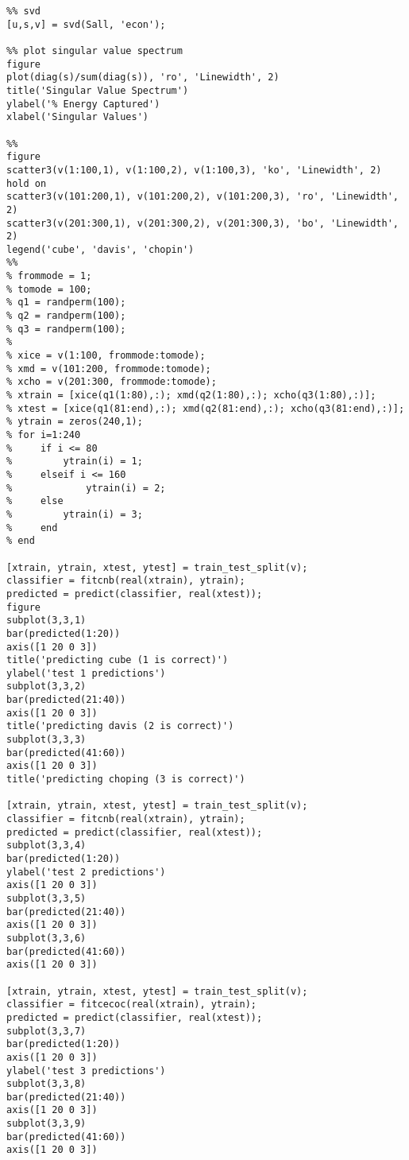 \documentclass[12pt, a4paper]{article}
\begin{document}
\begin{verbatim}
%% svd
[u,s,v] = svd(Sall, 'econ');

%% plot singular value spectrum
figure
plot(diag(s)/sum(diag(s)), 'ro', 'Linewidth', 2)
title('Singular Value Spectrum')
ylabel('% Energy Captured')
xlabel('Singular Values')

%%
figure
scatter3(v(1:100,1), v(1:100,2), v(1:100,3), 'ko', 'Linewidth', 2)
hold on 
scatter3(v(101:200,1), v(101:200,2), v(101:200,3), 'ro', 'Linewidth', 2)
scatter3(v(201:300,1), v(201:300,2), v(201:300,3), 'bo', 'Linewidth', 2)
legend('cube', 'davis', 'chopin')
%%
% frommode = 1;
% tomode = 100;
% q1 = randperm(100);
% q2 = randperm(100);
% q3 = randperm(100);
% 
% xice = v(1:100, frommode:tomode);
% xmd = v(101:200, frommode:tomode);
% xcho = v(201:300, frommode:tomode);
% xtrain = [xice(q1(1:80),:); xmd(q2(1:80),:); xcho(q3(1:80),:)];
% xtest = [xice(q1(81:end),:); xmd(q2(81:end),:); xcho(q3(81:end),:)];
% ytrain = zeros(240,1);
% for i=1:240
%     if i <= 80
%         ytrain(i) = 1;
%     elseif i <= 160
%             ytrain(i) = 2;
%     else
%         ytrain(i) = 3;
%     end
% end

[xtrain, ytrain, xtest, ytest] = train_test_split(v);
classifier = fitcnb(real(xtrain), ytrain);
predicted = predict(classifier, real(xtest));
figure
subplot(3,3,1)
bar(predicted(1:20))
axis([1 20 0 3])
title('predicting cube (1 is correct)')
ylabel('test 1 predictions')
subplot(3,3,2)
bar(predicted(21:40))
axis([1 20 0 3])
title('predicting davis (2 is correct)')
subplot(3,3,3)
bar(predicted(41:60))
axis([1 20 0 3])
title('predicting choping (3 is correct)')

[xtrain, ytrain, xtest, ytest] = train_test_split(v);
classifier = fitcnb(real(xtrain), ytrain);
predicted = predict(classifier, real(xtest));
subplot(3,3,4)
bar(predicted(1:20))
ylabel('test 2 predictions')
axis([1 20 0 3])
subplot(3,3,5)
bar(predicted(21:40))
axis([1 20 0 3])
subplot(3,3,6)
bar(predicted(41:60))
axis([1 20 0 3])

[xtrain, ytrain, xtest, ytest] = train_test_split(v);
classifier = fitcecoc(real(xtrain), ytrain);
predicted = predict(classifier, real(xtest));
subplot(3,3,7)
bar(predicted(1:20))
axis([1 20 0 3])
ylabel('test 3 predictions')
subplot(3,3,8)
bar(predicted(21:40))
axis([1 20 0 3])
subplot(3,3,9)
bar(predicted(41:60))
axis([1 20 0 3])
\end{verbatim}
\end{document}
